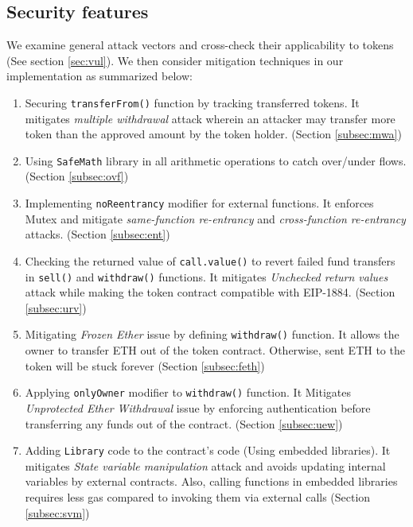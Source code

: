 {\blue 
\subsection{Security features}
We examine general attack vectors and cross-check their applicability to \erc tokens (See section \ref{sec:vul}). We then consider mitigation techniques in our implementation as summarized below:
\begin{enumerate}[noitemsep,topsep=0pt]
	\item Securing \texttt{transferFrom()} function by tracking transferred tokens. It mitigates \textit{multiple withdrawal} attack wherein an attacker may transfer more token than the approved amount by the token holder. (\cf Section \ref{subsec:mwa})

	\item Using \texttt{SafeMath} library in all arithmetic operations to catch over/under flows. (\cf Section \ref{subsec:ovf})

	\item Implementing \texttt{noReentrancy} modifier for external functions. It enforces Mutex and mitigate \textit{same-function re-entrancy} and \textit{cross-function re-entrancy} attacks. (\cf Section \ref{subsec:ent})

	\item Checking the returned value of \texttt{call.value()} to revert failed fund transfers in \texttt{sell()} and \texttt{withdraw()} functions. It mitigates \textit{Unchecked return values} attack while making the token contract compatible with EIP-1884\cite{EIP1884}. (\cf Section \ref{subsec:urv})

	\item Mitigating \textit{Frozen Ether} issue by defining \texttt{withdraw()} function. It allows the owner to transfer ETH out of the token contract. Otherwise, sent ETH to the token will be stuck forever (\cf Section \ref{subsec:feth})

	\item Applying \texttt{onlyOwner} modifier to \texttt{withdraw()} function. It Mitigates \textit{Unprotected Ether Withdrawal} issue by enforcing authentication before transferring any funds out of the contract. (\cf Section \ref{subsec:uew})

	\item Adding \texttt{Library} code to the \erc contract's code (\ie Using embedded libraries). It mitigates \textit{State variable manipulation} attack and avoids updating internal variables by external contracts. Also, calling functions in embedded libraries requires less gas compared to invoking them via external calls (\cf Section \ref{subsec:svm})
	

\end{enumerate}}
